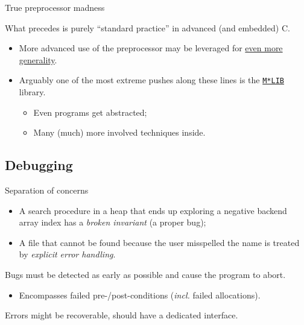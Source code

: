 \begin{frame}[fragile]{True preprocessor madness}

  What precedes is purely ``standard practice'' in advanced (and embedded) C.

  \begin{itemize}
  \item More advanced use of the preprocessor may be leveraged for \href{https://github.com/Hirrolot/awesome-c-preprocessor}{even more generality}.
  
  \item Arguably one of the most extreme pushes along these lines is the \href{https://github.com/P-p-H-d/mlib}{\lstinline{M*LIB}} library.
    \begin{itemize}
    \item Even programs get abstracted;
    \item Many (much) more involved techniques inside.
    \end{itemize}
  \end{itemize}

\end{frame}

\subsection{Debugging}

\begin{frame}[fragile]{Separation of concerns}

  \begin{itemize}
  \item A search procedure in a heap that ends up exploring a negative backend array index has a {\em broken invariant} (a proper bug);
  \item A file that cannot be found because the user misspelled the name is treated by {\em explicit error handling}.
  \end{itemize}

  Bugs must be detected as early as possible and cause the program to abort.
  \begin{itemize}
  \item Encompasses failed pre-/post-conditions ({\em incl.} failed allocations).
  \end{itemize}

  Errors might be recoverable, should have a dedicated interface.
  
\end{frame}


